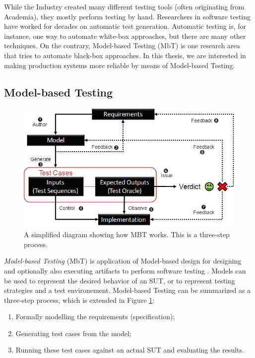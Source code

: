 While the Industry created many different testing tools (often
originating from Academia), they mostly perform testing by hand.
Researchers in software testing have worked for decades on
automatic test generation. Automatic testing is, for instance,
one way to automate white-box approaches, but there are many
other techniques. On the contrary, Model-based Testing (MbT) is
one research area that tries to automate black-box approaches.
In this thesis, we are interested in making production systems
more reliable by means of Model-based Testing.

\subsection{Model-based Testing}
\label{sec:related:testing:mbt}

\begin{figure}[ht]
    \begin{center}
    \includegraphics[width=1.0\linewidth]{figures/mbt.png}
    \end{center}

    \caption{A simplified diagram showing how MBT works. This is
    a three-step process.}
    \label{fig:mbt}
\end{figure}

\textit{Model-based Testing} (MbT) is application of Model-based
design for designing and optionally also executing artifacts to
perform software testing \cite{Jorgensen:1995:STC:526521}.
Models can be used to represent the desired behavior of an SUT,
or to represent testing strategies and a test environement.
Model-based Testing can be summarized as a three-step process,
which is extended in Figure \ref{fig:mbt}:

\begin{enumerate}
\item Formally modelling the requirements (specification);

\item Generating test cases from the model;

\item Running these test cases against an actual SUT and
evaluating the results.
\end{enumerate}

